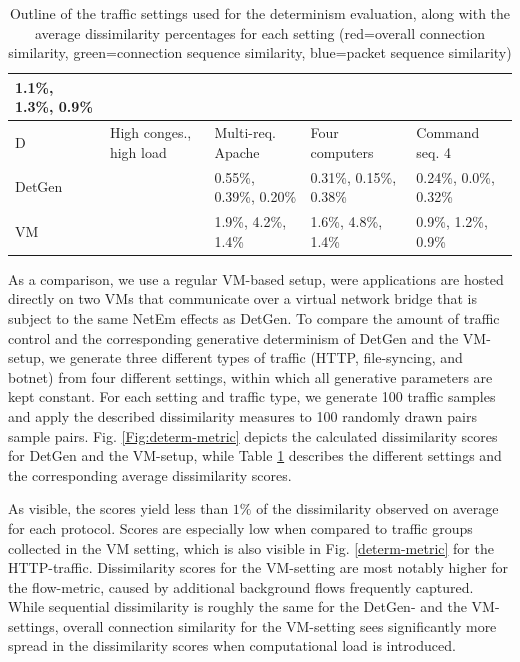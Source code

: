 \documentclass[sigconf]{acmart}
\begin{document}
\begin{table}
\begin{tabular}{p{1cm}|p{3.2cm}|p{2.7cm}|p{2.7cm}|p{2.7cm}}
 \footnotesize \textcolor{myred}{1.1\%}, \textcolor{mygreen}{1.3\%}, \textcolor{myblue}{0.9\%}\\ \hline \hline
D& High conges., high load & Multi-req. Apache & Four computers & Command seq. 4\\ \hline
DetGen &&\footnotesize \textcolor{myred}{0.55\%}, \textcolor{mygreen}{0.39\%}, \textcolor{myblue}{0.20\%}&
 \footnotesize \textcolor{myred}{0.31\%}, \textcolor{mygreen}{0.15\%}, \textcolor{myblue}{0.38\%}&
 \footnotesize \textcolor{myred}{0.24\%}, \textcolor{mygreen}{0.0\%}, \textcolor{myblue}{0.32\%}\\ \hline \hline
VM & &\footnotesize \textcolor{myred}{1.9\%}, \textcolor{mygreen}{4.2\%}, \textcolor{myblue}{1.4\%}&
 \footnotesize \textcolor{myred}{1.6\%}, \textcolor{mygreen}{4.8\%}, \textcolor{myblue}{1.4\%}&
 \footnotesize \textcolor{myred}{0.9\%}, \textcolor{mygreen}{1.2\%}, \textcolor{myblue}{0.9\%}\\ \hline \hline
\end{tabular}
\caption{Outline of the traffic settings used for the determinism evaluation, along with the average dissimilarity percentages for each setting (red=overall connection similarity, green=connection sequence similarity, blue=packet sequence similarity)}\label{Tab:Dataset}
\end{table}


As a comparison, we use a regular VM-based setup, were applications are hosted directly on two VMs that communicate over a virtual network bridge that is subject to the same NetEm effects as DetGen. To compare the amount of traffic control and the corresponding generative determinism of DetGen and the VM-setup, we generate three different types of traffic (HTTP, file-syncing, and botnet) from four different settings, within which all generative parameters are kept constant. For each setting and traffic type, we generate 100 traffic samples and apply the described dissimilarity measures to 100 randomly drawn pairs sample pairs. Fig. \ref{Fig:determ-metric} depicts the calculated dissimilarity scores for DetGen and the VM-setup, while Table \ref{Tab:Dataset} describes the different settings and the corresponding average dissimilarity scores.

As visible, the scores yield less than $1\%$ of the dissimilarity observed on average for each protocol. Scores are especially low when compared to traffic groups collected in the VM setting, which is also visible in Fig. \ref{determ-metric} for the HTTP-traffic. Dissimilarity scores for the VM-setting are most notably higher for the flow-metric, caused by additional background flows frequently captured. While sequential dissimilarity is roughly the same for the DetGen- and the VM-settings, overall connection similarity for the VM-setting sees significantly more spread in the dissimilarity scores when computational load is introduced.
\end{document}
